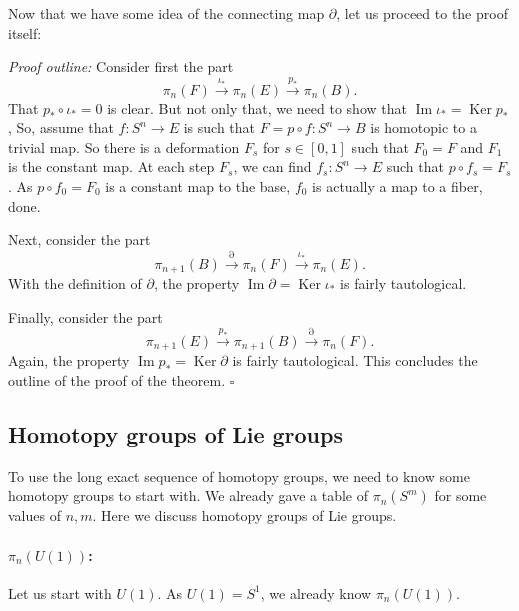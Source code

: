 \documentclass[12pt]{article}
\numberwithin{equation}{section}
\numberwithin{figure}{section}
\theoremstyle{remark}
\renewenvironment{proof}{\noindent\textsl{Proof outline:}}{\hfill$\square$}
\def\Ker{\mathop{\mathrm{Ker}}}
\def\Im{\mathop{\mathrm{Im}}}
\begin{document}
Now that we have some idea of the connecting map $\partial$,
let us proceed to the proof itself:

\begin{proof}
Consider first the part \begin{equation}
\pi_{n}(F) \stackrel{\iota_*}{\longrightarrow} \pi_{n}(E) \stackrel{p_*}{\longrightarrow} \pi_{n}(B).
\end{equation}
That $p_*\circ \iota_*=0$ is clear.
But not only that, we need to show that $\Im \iota_* = \Ker p_*$,
So, assume that $f:S^n\to E$ is such that $F=p\circ f: S^n\to B$ is homotopic to a trivial map.
So there is a deformation $F_s$ for $s\in [0,1]$ such that $F_0=F$ and $F_1$ is the constant map.
At each step $F_s$, we can find $f_s:S^n \to E$ such that $p\circ f_s=F_s$.
As $p\circ f_0=F_0$ is a constant map to the base, $f_0$ is actually a map to a fiber, done.

Next, consider the part \begin{equation}
  \pi_{n+1}(B)\stackrel{\partial}{\longrightarrow}\pi_{n}(F) \stackrel{\iota_*}{\longrightarrow} \pi_{n}(E).
\end{equation}
With the definition of $\partial$, the property $\Im \partial = \Ker \iota_*$ is fairly tautological.

Finally, consider the part \begin{equation}
  \pi_{n+1}(E) \stackrel{p_*}{\longrightarrow} \pi_{n+1}(B) \stackrel{\partial}{\longrightarrow} \pi_{n}(F).
\end{equation}
Again, the property $\Im p_* = \Ker \partial$ is fairly tautological.
This concludes the outline of the proof of the theorem.
\end{proof}



\subsection{Homotopy groups of Lie groups}

To use the long exact sequence of homotopy groups,
we need to know some homotopy groups to start with.
We already gave a table of $\pi_n(S^m)$ for some values of $n,m$.
Here we discuss homotopy groups of Lie groups.

\paragraph{$\pi_n(U(1))$:}
Let us start with $U(1)$. As $U(1)=S^1$, we already know $\pi_n(U(1))$.
\end{document}
